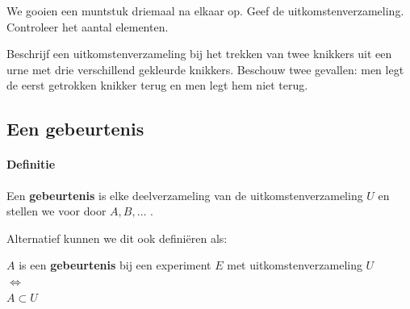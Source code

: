 \documentclass[12pt,twoside]{article}
\begin{document}
\begin{oefening}
We gooien een muntstuk driemaal na elkaar op. Geef de uitkomstenverzameling. Controleer het aantal elementen.
\end{oefening}

\begin{oefening}
Beschrijf een uitkomstenverzameling bij het trekken van twee knikkers uit een urne met drie verschillend gekleurde knikkers. Beschouw twee gevallen: men legt de eerst getrokken knikker terug en men legt hem niet terug.
\end{oefening}

\subsection{Een gebeurtenis}

\paragraph*{Definitie} Een {\bf gebeurtenis} is elke deelverzameling van de uitkomstenverzameling $U$ en stellen
we voor door $A, B, \ldots$ .

Alternatief kunnen we dit ook definiëren als:\\
\begin{mdframed}
\begin{center}
$A$ is een {\bf gebeurtenis} bij een experiment $E$ met uitkomstenverzameling $U$\\
$\Leftrightarrow$\\
$A\subset U$
\end{center}
\end{mdframed}
\end{document}
